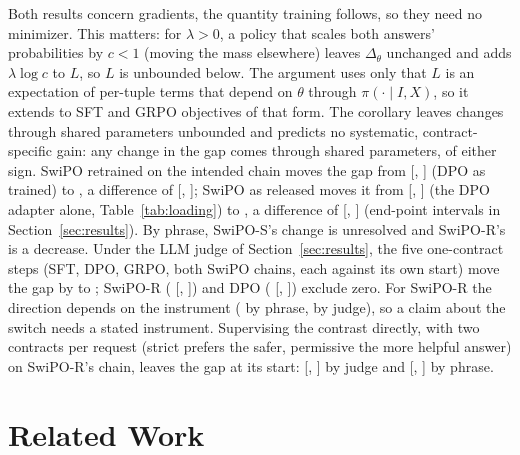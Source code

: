 \documentclass[letterpaper]{article} %
\begin{document}
\noindent Both results concern gradients, the quantity training follows, so they need no minimizer. This matters: for $\lambda>0$, a policy that scales both answers' probabilities by $c<1$ (moving the mass elsewhere) leaves $\Delta_\theta$ unchanged and adds $\lambda\log c$ to $L$, so $L$ is unbounded below. The argument uses only that $L$ is an expectation of per-tuple terms that depend on $\theta$ through $\pi(\cdot\mid I,X)$, so it extends to SFT and GRPO objectives of that form. The corollary leaves changes through shared parameters unbounded and predicts no systematic, contract-specific gain: any change in the gap comes through shared parameters, of either sign. SwiPO retrained on the intended chain moves the gap from \nDPOTrained{} [\nDPOTrainedLo{}, \nDPOTrainedHi{}] (DPO as trained) to \nSwiPOS{}, a difference of \nSwiPOSvsDPO{} [\nSwiPOSvsDPOLo{}, \nSwiPOSvsDPOHi{}]; SwiPO as released moves it from \nDPOFinal{} [\nDPOFinalLo{}, \nDPOFinalHi{}] (the DPO adapter alone, Table~\ref{tab:loading}) to \nSwiPOR{}, a difference of \nSwiPORvsStart{} [\nSwiPORvsStartLo{}, \nSwiPORvsStartHi{}] (end-point intervals in Section~\ref{sec:results}). By phrase, \mbox{SwiPO-S}'s change is unresolved and \mbox{SwiPO-R}'s is a decrease. Under the LLM judge of Section~\ref{sec:results}, the five one-contract steps (SFT, DPO, GRPO, both SwiPO chains, each against its own start) move the gap by \nJudgeStepLo{} to \nJudgeStepHi{}; \mbox{SwiPO-R} (\nSwiPORJudgeVsStart{} [\nSwiPORJudgeVsStartLo{}, \nSwiPORJudgeVsStartHi{}]) and DPO (\nDPOJudgeVsStart{} [\nDPOJudgeVsStartLo{}, \nDPOJudgeVsStartHi{}]) exclude zero. For \mbox{SwiPO-R} the direction depends on the instrument (\nSwiPORvsStart{} by phrase, \nSwiPORJudgeVsStart{} by judge), so a claim about the switch needs a stated instrument. Supervising the contrast directly, with two contracts per request (strict prefers the safer, permissive the more helpful answer) on \mbox{SwiPO-R}'s chain, leaves the gap at its start: \nGoneJudgeVsStart{} [\nGoneJudgeVsStartLo{}, \nGoneJudgeVsStartHi{}] by judge and \nGonePhraseVsStart{} [\nGonePhraseVsStartLo{}, \nGonePhraseVsStartHi{}] by phrase.







\section{Related Work}
\end{document}
